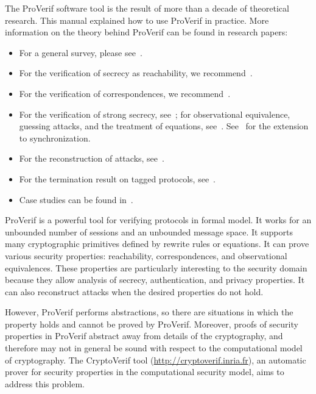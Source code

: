 \documentclass{book}
\begin{document}
The ProVerif software tool is the result of more than a decade of
theoretical research. This manual explained how to use ProVerif in
practice. More information on the theory behind ProVerif can be found
in research papers:
\begin{itemize}

\item For a general survey, please see~\cite{Blanchet16b}.

\item For the verification of secrecy as reachability, we recommend~\cite{Blanchet2010,Abadi04c}.

\item For the verification of correspondences, we recommend~\cite{Blanchet08c}.

\item For the verification of strong secrecy, see~\cite{Blanchet04};
  for observational equivalence, guessing attacks, and the treatment
  of equations, see~\cite{Blanchet07b}. See~\cite{Blanchet18a} for the
  extension to synchronization.

\item For the reconstruction of attacks, see~\cite{Allamigeon05}.

\item For the termination result on tagged protocols, see~\cite{Blanchet04e}.

\item Case studies can be found in~\cite{Abadi04f,Abadi07,Blanchet08b,KobeissiEuroSP17,BhargavanSP17,Blanchet17}.

\end{itemize}

ProVerif is a powerful tool for verifying protocols in formal
model. It works for an unbounded number of sessions and an unbounded
message space. It supports many cryptographic primitives defined by
rewrite rules or equations. It can prove various security properties:
reachability, correspondences, and observational equivalences. These
properties are particularly interesting to the security domain because
they allow analysis of secrecy, authentication, and privacy
properties. It can also reconstruct attacks when the desired
properties do not hold.

However, ProVerif performs abstractions, so there are situations
in which the property holds and cannot be proved by ProVerif.
Moreover, proofs of security properties in ProVerif abstract away
from details of the cryptography, and therefore may not in general
be sound with respect to the computational model of cryptography.
The CryptoVerif tool (\url{http://cryptoverif.inria.fr}), an automatic
prover for security properties in the computational security model,
aims to address this problem.
\end{document}
